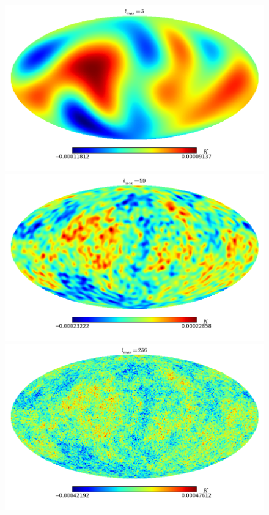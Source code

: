 \begin{figure}
\begin{center}
\includegraphics[scale=0.3]{CMB/l5.png}
\includegraphics[scale=0.3]{CMB/l50.png}
\includegraphics[scale=0.3]{CMB/l256.png}

\end{center}
\end{figure}
